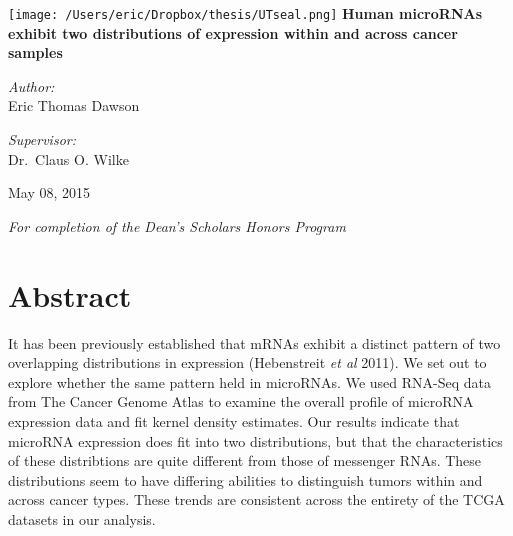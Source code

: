 \documentclass[12pt]{report}
\begin{document}
\begin{titlepage}
\begin{center}
 \texttt{[image: /Users/eric/Dropbox/thesis/UTseal.png]}
 \vfill
 \Huge \textbf{Human microRNAs exhibit two distributions of expression within and across cancer samples}
 \vfill
\noindent
\begin{minipage}[t]{0.4\textwidth}
\begin{flushleft} \large
\emph{Author:}\\
Eric Thomas Dawson
\end{flushleft}
\end{minipage}%
\begin{minipage}[t]{0.4\textwidth}
\begin{flushright} \large
\emph{Supervisor:} \\
Dr.~Claus O. Wilke
\end{flushright}
\end{minipage}
\vfill
\large May 08, 2015

\large \textit{For completion of the Dean's Scholars Honors Program}
\end{center}
\vfill

\vfill

\end{titlepage}





\section*{Abstract}
It has been previously established that mRNAs exhibit a distinct pattern of two overlapping distributions in expression (Hebenstreit \textit{et al} 2011).
We set out to explore whether the same pattern held in microRNAs.
We used RNA-Seq data from The Cancer Genome Atlas to examine the overall profile of microRNA expression data and fit kernel density estimates.
Our results indicate that microRNA expression does fit into two
distributions, but that the characteristics of these distribtions are quite different from those of messenger RNAs. These distributions  seem to have differing abilities
to distinguish tumors within and across cancer types. These trends are consistent across the entirety of the TCGA datasets in our analysis.
\end{document}

